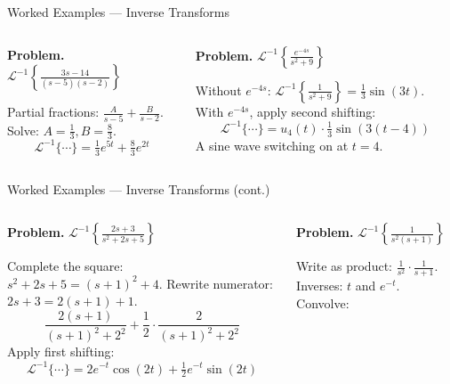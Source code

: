 \documentclass[aspectratio=169,11pt]{beamer}
\newcommand{\resizeeq}[1]{\resizebox{\textwidth}{!}{$#1$}}
\begin{document}
\begin{frame}{Worked Examples --- Inverse Transforms}
\footnotesize
\begin{columns}[T]
\begin{column}{0.48\textwidth}
\begin{examplebox}
\textbf{Problem.} $\mathcal{L}^{-1}\!\left\{\frac{3s-14}{(s-5)(s-2)}\right\}$

Partial fractions: $\frac{A}{s-5} + \frac{B}{s-2}$. Solve: $A = \tfrac{1}{3}, B = \tfrac{8}{3}$.
\[\mathcal{L}^{-1}\{\cdots\} = \tfrac{1}{3}e^{5t} + \tfrac{8}{3}e^{2t}\]
\end{examplebox}
\end{column}
\begin{column}{0.48\textwidth}
\begin{examplebox}
\textbf{Problem.} $\mathcal{L}^{-1}\!\left\{\frac{e^{-4s}}{s^2+9}\right\}$

Without $e^{-4s}$: $\mathcal{L}^{-1}\!\left\{\frac{1}{s^2+9}\right\} = \tfrac{1}{3}\sin(3t)$. With $e^{-4s}$, apply second shifting:
\[\mathcal{L}^{-1}\{\cdots\} = u_4(t)\cdot\tfrac{1}{3}\sin(3(t-4))\]
A sine wave switching on at $t = 4$.
\end{examplebox}
\end{column}
\end{columns}
\end{frame}

\begin{frame}{Worked Examples --- Inverse Transforms (cont.)}
\footnotesize
\begin{columns}[T]
\begin{column}{0.48\textwidth}
\begin{examplebox}
\textbf{Problem.} $\mathcal{L}^{-1}\!\left\{\frac{2s+3}{s^2+2s+5}\right\}$

Complete the square: $s^2+2s+5 = (s+1)^2+4$. Rewrite numerator: $2s+3 = 2(s+1)+1$.
\[\frac{2(s+1)}{(s+1)^2+2^2} + \frac{1}{2}\cdot\frac{2}{(s+1)^2+2^2}\]
Apply first shifting:
\[\mathcal{L}^{-1}\{\cdots\} = 2e^{-t}\cos(2t) + \tfrac{1}{2}e^{-t}\sin(2t)\]
\end{examplebox}
\end{column}
\begin{column}{0.48\textwidth}
\begin{examplebox}[Convolution]
\textbf{Problem.} $\mathcal{L}^{-1}\!\left\{\frac{1}{s^2(s+1)}\right\}$

Write as product: $\frac{1}{s^2}\cdot\frac{1}{s+1}$. Inverses: $t$ and $e^{-t}$. Convolve:
\resizeeq{\mathcal{L}^{-1}\{\cdots\} = (t) * (e^{-t}) = \int_0^t (t-\tau)\,e^{-\tau}\,d\tau = t + e^{-t} - 1}
\end{examplebox}
\end{column}
\end{columns}
\end{frame}
\end{document}
